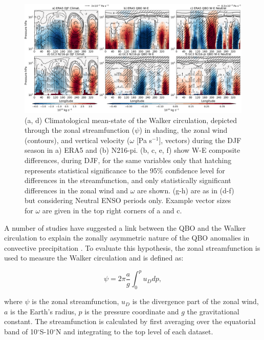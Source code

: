 \begin{figure}[t!]
\centering
 \noindent
 \includegraphics[width=\linewidth]{figures/cmip_era5_streamdjf.png}
\caption[Walker circulation anomalies in DJF]{(a, d) Climatological mean-state of the Walker circulation, depicted through the zonal streamfunction ($\psi$) in shading, the zonal wind (contours), and vertical velocity ($\omega$ [Pa s$^{-1}$], vectors) during the DJF season in a) ERA5 and (b) N216-pi. (b, c, e, f) show W-E composite differences, during DJF, for the same variables only that hatching represents statistical significance to the 95\% confidence level for differences in the streamfunction, and only statistically significant differences in the zonal wind and $\omega$ are shown. (g-h) are as in (d-f) but considering Neutral ENSO periods only. Example vector sizes for $\omega$ are given in the top right corners of a and c.  }
\label{fig:walker_djfm}
\end{figure}

A number of studies have suggested a link between the QBO and the Walker circulation to explain the zonally asymmetric nature of the QBO anomalies in convective precipitation \citep[e.g.][]{collimore2003,liess2012}. To evaluate this hypothesis, the zonal streamfunction is used to measure the Walker circulation \citep{yu2010,bayr2014} and is defined as:

\begin{equation}
\psi=2\pi \frac{a}{g} \int_0^p u_D dp,
\end{equation}

\noindent where $\psi$ is the zonal streamfunction, $u_D$ is the divergence part of the zonal wind, $a$ is the Earth's radius, $p$ is the pressure coordinate and $g$ the gravitational constant.
The streamfunction is calculated by first averaging over the equatorial band of 10$^\circ$S-10$^\circ$N and integrating to the top level of each dataset.

